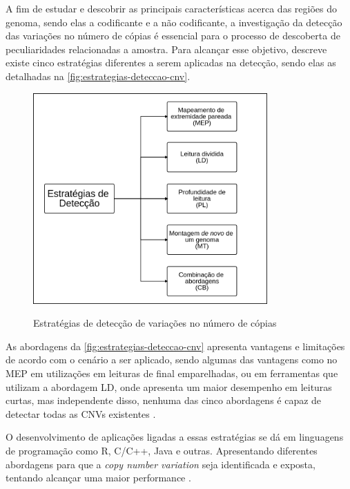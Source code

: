 A fim de estudar e descobrir as principais características acerca das regiões do genoma, sendo elas a codificante e a não codificante, a investigação da detecção das variações no número de cópias é essencial para o processo de descoberta de peculiaridades relacionadas a amostra. Para alcançar esse objetivo, \cite{Zhao2013} descreve existe cinco estratégias diferentes a serem aplicadas na detecção, sendo elas as detalhadas na \autoref{fig:estrategias-deteccao-cnv}.

\begin{figure}[!htb]
    \centering
    \caption{Estratégias de detecção de variações no número de cópias}
    \includegraphics[width=0.8\textwidth]{./dados/figuras/estrategias-deteccao-cnv}
    \label{fig:estrategias-deteccao-cnv}
\end{figure}

As abordagens da \autoref{fig:estrategias-deteccao-cnv} apresenta vantagens e limitações de acordo com o cenário a ser aplicado, sendo algumas das vantagens como no MEP em utilizações em leituras de final emparelhadas, ou em ferramentas que utilizam a abordagem LD, onde apresenta um maior desempenho em leituras curtas, mas independente disso, nenhuma das cinco abordagens é capaz de detectar todas as CNVs existentes \cite{Zhao2013}. 

O desenvolvimento de aplicações ligadas a essas estratégias se dá em linguagens de programação como R, C/C++, Java e outras. Apresentando diferentes abordagens para que a \textit{copy number variation} seja identificada e exposta, tentando alcançar uma maior performance \cite{Zhao2013}.

